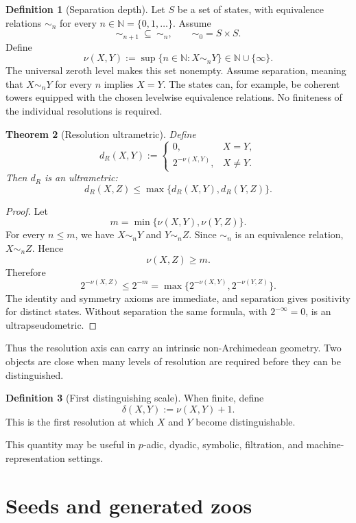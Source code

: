 \documentclass[11pt]{article}
\newtheorem{theorem}{Theorem}[section]
\theoremstyle{definition}
\newtheorem{definition}[theorem]{Definition}
\theoremstyle{remark}
\begin{document}
\begin{definition}[Separation depth]
Let $S$ be a set of states, with equivalence relations $\sim_n$ for every $n\in\mathbb N=\{0,1,\ldots\}$. Assume
\[
\sim_{n+1}\ \subseteq\ \sim_n,
\qquad \sim_0=S\times S.
\]
Define
\[
\nu(X,Y):=\sup\{n\in\mathbb N:X\sim_nY\}\in\mathbb N\cup\{\infty\}.
\]
The universal zeroth level makes this set nonempty. Assume separation, meaning that $X\sim_nY$ for every $n$ implies $X=Y$. The states can, for example, be coherent towers equipped with the chosen levelwise equivalence relations. No finiteness of the individual resolutions is required.
\end{definition}

\begin{theorem}[Resolution ultrametric]\label{thm:ultrametric}
Define
\[
d_R(X,Y):=
\begin{cases}
0,&X=Y,\\
2^{-\nu(X,Y)},&X\ne Y.
\end{cases}
\]
Then $d_R$ is an ultrametric:
\[
d_R(X,Z)\le\max\{d_R(X,Y),d_R(Y,Z)\}.
\]
\end{theorem}

\begin{proof}
Let
\[
m=\min\{\nu(X,Y),\nu(Y,Z)\}.
\]
For every $n\le m$, we have $X\sim_nY$ and $Y\sim_nZ$. Since $\sim_n$ is an equivalence relation, $X\sim_nZ$. Hence
\[
\nu(X,Z)\ge m.
\]
Therefore
\[
2^{-\nu(X,Z)}
\le
2^{-m}
=
\max\{2^{-\nu(X,Y)},2^{-\nu(Y,Z)}\}.
\]
The identity and symmetry axioms are immediate, and separation gives positivity for distinct states. Without separation the same formula, with $2^{-\infty}=0$, is an ultrapseudometric.
\end{proof}

Thus the resolution axis can carry an intrinsic non-Archimedean geometry. Two objects are close when many levels of resolution are required before they can be distinguished.

\begin{definition}[First distinguishing scale]
When finite, define
\[
\delta(X,Y):=\nu(X,Y)+1.
\]
This is the first resolution at which $X$ and $Y$ become distinguishable.
\end{definition}

This quantity may be useful in $p$-adic, dyadic, symbolic, filtration, and machine-representation settings.

\section{Seeds and generated zoos}
\end{document}
